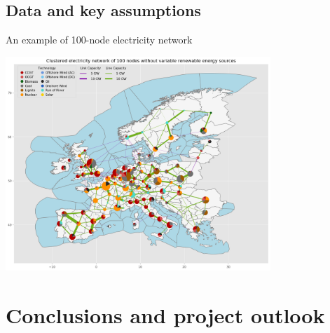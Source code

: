 \subsection{Data and key assumptions}


\begin{frame}{An example of 100-node electricity network}

  \centering

  \includegraphics[width=10cm]{images/elec_s_100.png}
  
   \vspace{0.1cm}
  
\end{frame}


\section{Conclusions and project outlook}

